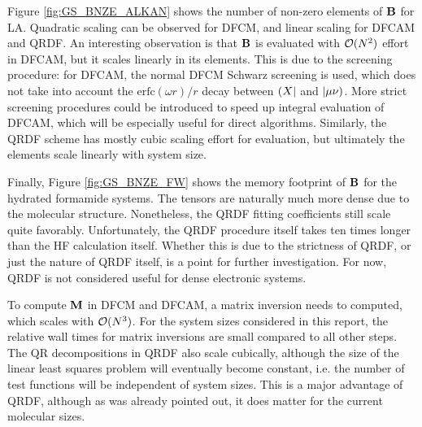 Figure \ref{fig:GS_BNZE_ALKAN} shows the number of non-zero elements of $\mathbf{B}$ for LA. Quadratic scaling can be observed for DFCM, and linear scaling for DFCAM and QRDF. An interesting observation is that $\mathbf{B}$ is evaluated with $\mathcal{O}(N^{2})$ effort in DFCAM, but it scales linearly in its elements. This is due to the screening procedure: for DFCAM, the normal DFCM Schwarz screening is used, which does not take into account the $\textrm{erfc}(\omega r)/r$ decay between $\left( X \right\rvert$ and $\left\lvert \mu\nu \right)$. More strict screening procedures could be introduced to speed up integral evaluation of DFCAM, which will be especially useful for direct algorithms. Similarly, the QRDF scheme has mostly cubic scaling effort for evaluation, but ultimately the elements scale linearly with system size. 

Finally, Figure \ref{fig:GS_BNZE_FW} shows the memory footprint of $\mathbf{B}$ for the hydrated formamide systems. The tensors are naturally much more dense due to the molecular structure. Nonetheless, the QRDF fitting coefficients still scale quite favorably. Unfortunately, the QRDF procedure itself takes ten times longer than the HF calculation itself. Whether this is due to the strictness of QRDF, or just the nature of QRDF itself, is a point for further investigation. For now, QRDF is not considered useful for dense electronic systems. 

To compute $\mathbf{M}$ in DFCM and DFCAM, a matrix inversion needs to computed, which scales with $\mathcal{O}(N^{3})$. For the system sizes considered in this report, the relative wall times for matrix inversions are small compared to all other steps. The QR decompositions in QRDF also scale cubically, although the size of the linear least squares problem will eventually become constant, i.e. the number of test functions will be independent of system sizes. This is a major advantage of QRDF, although as was already pointed out, it does matter for the current molecular sizes.

